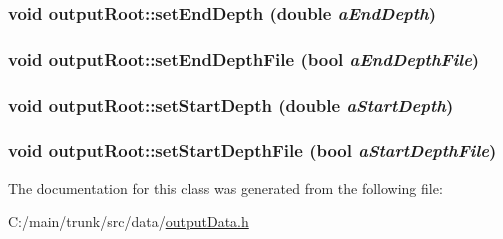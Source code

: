 \hypertarget{classoutput_root_a7751413cbb2ca69736014365e393b252}{
\subsubsection[{setEndDepth}]{\setlength{\rightskip}{0pt plus 5cm}void outputRoot::setEndDepth (double {\em aEndDepth})}}
\label{classoutput_root_a7751413cbb2ca69736014365e393b252}
\hypertarget{classoutput_root_adcd955b3304ed6a03b926d8dc060cd13}{
\subsubsection[{setEndDepthFile}]{\setlength{\rightskip}{0pt plus 5cm}void outputRoot::setEndDepthFile (bool {\em aEndDepthFile})}}
\label{classoutput_root_adcd955b3304ed6a03b926d8dc060cd13}
\hypertarget{classoutput_root_a1a1aa7740a66961e4348a6aa1874354e}{
\subsubsection[{setStartDepth}]{\setlength{\rightskip}{0pt plus 5cm}void outputRoot::setStartDepth (double {\em aStartDepth})}}
\label{classoutput_root_a1a1aa7740a66961e4348a6aa1874354e}
\hypertarget{classoutput_root_a40e1650e258c23ae44afdd3e399a7d38}{
\subsubsection[{setStartDepthFile}]{\setlength{\rightskip}{0pt plus 5cm}void outputRoot::setStartDepthFile (bool {\em aStartDepthFile})}}
\label{classoutput_root_a40e1650e258c23ae44afdd3e399a7d38}


The documentation for this class was generated from the following file:\begin{DoxyCompactItemize}
\item 
C:/main/trunk/src/data/\hyperlink{output_data_8h}{outputData.h}\end{DoxyCompactItemize}
